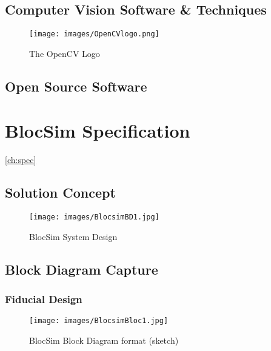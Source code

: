 \section{Computer Vision Software \& Techniques}

\begin{figure}[ht!]
\centering
\texttt{[image: images/OpenCVlogo.png]}
\caption{The OpenCV Logo \cite{opencv}}
\label{im:cvlogo}
\end{figure}


\section{Open Source Software}





\chapter{BlocSim Specification}
\ref{ch:spec}



\section{Solution Concept}

\begin{figure}[ht!]
\centering
\texttt{[image: images/BlocsimBD1.jpg]}
\caption{BlocSim System Design \cite{blocsimPoster}}
\label{im:BlocsimBD1}
\end{figure}

\clearpage



\section{Block Diagram Capture}



\subsection{Fiducial Design}

\begin{figure}[ht!]
\centering
\texttt{[image: images/BlocsimBloc1.jpg]}
\caption{BlocSim Block Diagram format (sketch)}
\label{im:BlocsimBD1}
\end{figure}

